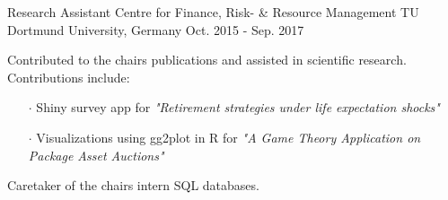 \begin{cventries}
\cventry
{Research Assistant} %
{Centre for Finance, Risk- \& Resource Management} %
{TU Dortmund University, Germany} %
{Oct. 2015 - Sep. 2017} %
{
  \begin{cvitems} %
    \item {Contributed to the chairs publications and assisted in scientific research. Contributions include:
      \begin{itemize}
        \item[$\cdot$] Shiny survey app for \textit{"Retirement strategies under life expectation shocks"} 
        \item[$\cdot$] Visualizations using gg2plot in R for \textit{"A Game Theory Application on Package Asset Auctions"}
      \end{itemize}
    }
    \item {Caretaker of the chairs intern SQL databases.}
  \end{cvitems}
}

\end{cventries}
